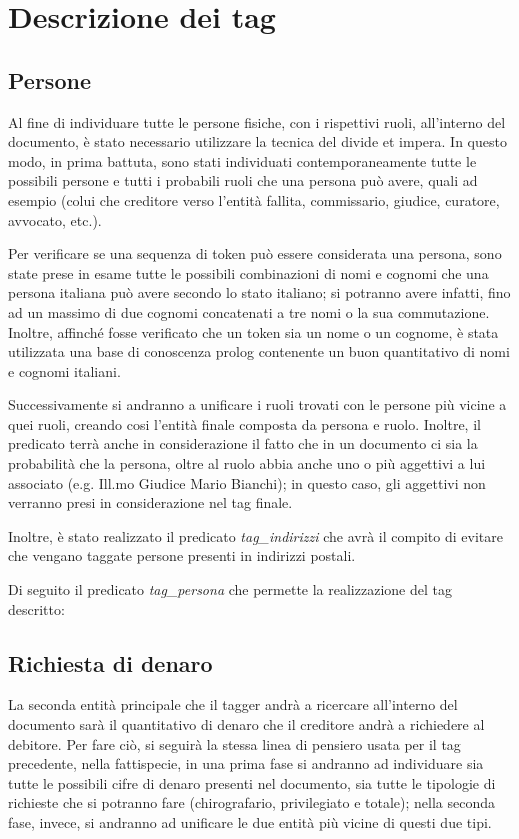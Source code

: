 \section{Descrizione dei tag}

\subsection{Persone}
Al fine di individuare tutte le persone fisiche, con i rispettivi ruoli, all'interno del documento, è stato necessario utilizzare la tecnica del divide et impera. In questo modo, in prima battuta, sono stati individuati contemporaneamente tutte le possibili persone e tutti i probabili ruoli che una persona può avere, quali ad esempio (colui che creditore verso l'entità fallita, commissario, giudice, curatore, avvocato, etc.).

Per verificare se una sequenza di token può essere considerata una persona, sono state prese in esame tutte le possibili combinazioni di nomi e cognomi che una persona italiana può avere secondo lo stato italiano; si potranno avere infatti, fino ad un massimo di due cognomi concatenati a tre nomi o la sua commutazione. Inoltre, affinché fosse verificato che un token sia un nome o un cognome, è stata utilizzata una base di conoscenza prolog contenente un buon quantitativo di nomi e cognomi italiani.

Successivamente si andranno a unificare i ruoli trovati con le persone più vicine a quei ruoli, creando cosi l'entità finale composta da persona e ruolo.
Inoltre, il predicato terrà anche in considerazione il fatto che in un documento ci sia la probabilità che la persona, oltre al ruolo abbia anche uno o più aggettivi a lui associato (e.g. Ill.mo Giudice Mario Bianchi); in questo caso, gli aggettivi non verranno presi in considerazione nel tag finale.

Inoltre, è stato realizzato il predicato \emph{tag\_indirizzi} che avrà il compito di evitare che vengano taggate persone presenti in indirizzi postali.

Di seguito il predicato \emph{tag\_persona} che permette la realizzazione del tag descritto:

\begin{prologcode}

\end{prologcode}



\subsection{Richiesta di denaro}
La seconda entità principale che il tagger andrà a ricercare all'interno del documento sarà il quantitativo di denaro che il creditore andrà a richiedere al debitore. Per fare ciò, si seguirà la stessa linea di pensiero usata per il tag precedente, nella fattispecie, in una prima fase si andranno ad individuare sia tutte le possibili cifre di denaro presenti nel documento, sia tutte le tipologie di richieste che si potranno fare (chirografario, privilegiato e totale); nella seconda fase, invece, si andranno ad unificare le due entità più vicine di questi due tipi.

